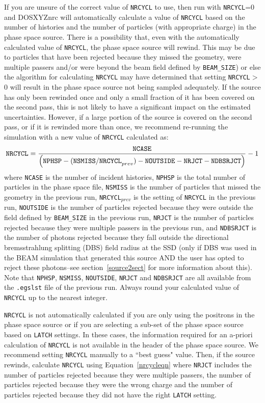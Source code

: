 \documentclass[12pt,twoside]{article}      %
\newcommand{\indexm}[1]{\index{#1}}
\begin{document}
If you are unsure of
the correct value of {\tt NRCYCL} to use, then
run with {\tt NRCYCL}=0 and DOSXYZnrc will automatically calculate
a value of {\tt NRCYCL} based on the number of histories and
the number of particles (with appropriate charge) in the phase space source.
There is a possibility
that, even with the automatically calculated value of {\tt NRCYCL},
the phase space source will rewind.  This may be due to particles
that have been rejected because they missed the geometry, were multiple
passers and/or were beyond the beam field defined by {\tt BEAM\_SIZE}) or
else the algorithm for calculating {\tt NRCYCL} may have determined that
setting {\tt NRCYCL}$>$ 0 will result in the phase space source not being
sampled adequately.
If the
source has only been rewinded once and only a small fraction of it
has been covered on the second pass, this is not likely to have a significant
impact on the estimated uncertainties.  However, if a large portion of the
source is covered on the second pass, or if it is rewinded more than once,
we recommend re-running the simulation with a new value of
{\tt NRCYCL} calculated as:
\begin{eqnarray}
\label{nrcycleqn}
{\tt
NRCYCL}=
\frac{{\tt NCASE}}{\left({\tt NPHSP - (NSMISS/NRCYCL}_{prev}) - {\tt NOUTSIDE - NRJCT - NDBSRJCT}\right)}-1
\end{eqnarray}
where {\tt NCASE} is the number of incident histories, {\tt NPHSP} is the
total number of particles in the phase space file, {\tt NSMISS} is
the number of particles that missed the geometry in the previous run,
{\tt NRCYCL$_{prev}$} is the setting of {\tt NRCYCL} in the previous run,
{\tt NOUTSIDE} is the number of particles rejected because they were
outside the field defined by {\tt BEAM\_SIZE} in the previous run,
{\tt NRJCT} is the number of particles rejected because they were
multiple passers in the previous run, and {\tt NDBSRJCT} is the number of
photons rejected because they fall outside the directional bremsstrahlung
splitting (DBS) field radius at the SSD (only if DBS was used in the BEAM
simulation that generated this source AND the user has opted to reject
these photons--see section~\ref{source2sect} for more information about
this).  Note that {\tt NPHSP}, {\tt NSMISS}, {\tt NOUTSIDE},
{\tt NRJCT} and {\tt NDBSRJCT} are all available from the {\tt .egslst} file of the previous run.
Always round your calculated value of {\tt NRCYCL} up to the nearest integer.
\indexm{DBS}
\indexm{NRCYCL}

{\tt NRCYCL} is not automatically calculated if you are only using the
positrons in the phase space source or if you are selecting a sub-set of
the phase space source based on {\tt LATCH} settings.  In these cases,
the information required for an a-priori calculation of {\tt NRCYCL}
is not available in the header of the phase space source.
We recommend setting {\tt NRCYCL} manually to a ``best guess" value.  Then,
if the source rewinds, calculate {\tt NRCYCL} using Equation~\ref{nrcycleqn}
where {\tt NRJCT} includes the number of particles rejected because they
were multiple passers, the number of particles rejected because they were
the wrong charge and the number of particles rejected because they did not
have the right {\tt LATCH} setting.
\end{document}
